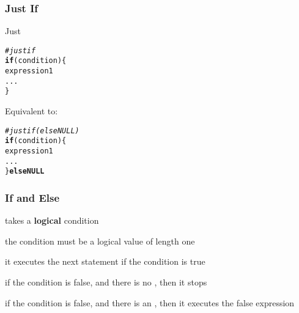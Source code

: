 \documentclass[12pt]{beamer}\usepackage[]{graphicx}\usepackage[]{color}
\makeatletter
\newcommand{\hlcom}[1]{\textcolor[rgb]{0.678,0.584,0.686}{\textit{#1}}}%
\newcommand{\hlstd}[1]{\textcolor[rgb]{0.345,0.345,0.345}{#1}}%
\newcommand{\hlkwa}[1]{\textcolor[rgb]{0.161,0.373,0.58}{\textbf{#1}}}%
\newenvironment{kframe}{%
 \def\at@end@of@kframe{}%
 \ifinner\ifhmode%
  \def\at@end@of@kframe{\end{minipage}}%
  \begin{minipage}{\columnwidth}%
 \fi\fi%
 \def\FrameCommand##1{\hskip\@totalleftmargin \hskip-\fboxsep
 \colorbox{shadecolor}{##1}\hskip-\fboxsep
     \hskip-\linewidth \hskip-\@totalleftmargin \hskip\columnwidth}%
 \MakeFramed {\advance\hsize-\width
   \@totalleftmargin\z@ \linewidth\hsize
   \@setminipage}}%
 {\par\unskip\endMakeFramed%
 \at@end@of@kframe}
\newenvironment{knitrout}{}{} %
\makeatother
\begin{document}

\begin{frame}[fragile]
\frametitle{Just If}

Just 
\begin{knitrout}\footnotesize
{}\color{fgcolor}\begin{kframe}
\begin{alltt}
\hlcom{# just if}
\hlkwa{if} \hlstd{(condition) \{}
  \hlstd{expression1}
  \hlstd{...}
\hlstd{\}}
\end{alltt}
\end{kframe}
\end{knitrout}

Equivalent to:
\begin{knitrout}\footnotesize
{}\color{fgcolor}\begin{kframe}
\begin{alltt}
\hlcom{# just if (else NULL)}
\hlkwa{if} \hlstd{(condition) \{}
  \hlstd{expression1}
  \hlstd{...}
\hlstd{\}} \hlkwa{else NULL}
\end{alltt}
\end{kframe}
\end{knitrout}

\end{frame}


\begin{frame}
\frametitle{If and Else}

\bi
  \item {} takes a \textbf{logical} condition
  \item the condition must be a logical value of length one
  \item it executes the next statement if the condition is true
  \item if the condition is false, and there is no , then it stops
  \item if the condition is false, and there is an , then it executes the false expression
\ei

\end{frame}

\end{document}
